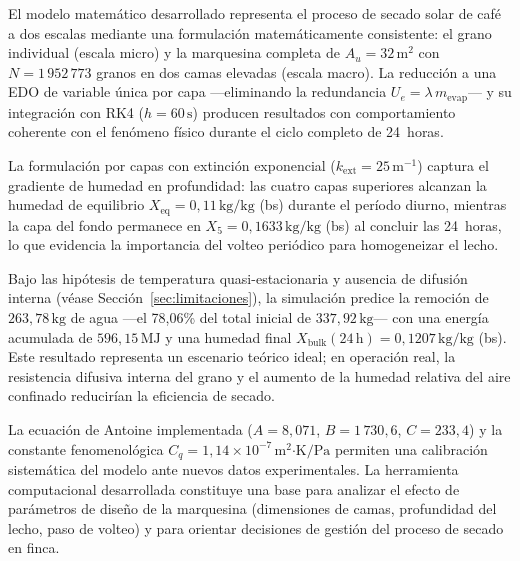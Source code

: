 \documentclass[conference]{IEEEtran}
\begin{document}
El modelo matemático desarrollado representa el proceso de secado solar de café a dos escalas mediante una formulación matemáticamente consistente: el grano individual (escala micro) y la marquesina completa de $A_u = 32\,\text{m}^2$ con $N = 1\,952\,773$ granos en dos camas elevadas (escala macro). La reducción a una EDO de variable única por capa —eliminando la redundancia $U_e = \lambda\,m_{\text{evap}}$— y su integración con RK4 ($h = 60\,\text{s}$) producen resultados con comportamiento coherente con el fenómeno físico durante el ciclo completo de 24~horas.

La formulación por capas con extinción exponencial ($k_{\text{ext}} = 25\,\text{m}^{-1}$) captura el gradiente de humedad en profundidad: las cuatro capas superiores alcanzan la humedad de equilibrio $X_{\text{eq}} = 0{,}11\,\text{kg/kg}$ (bs) durante el período diurno, mientras la capa del fondo permanece en $X_5 = 0{,}1633\,\text{kg/kg}$ (bs) al concluir las 24~horas, lo que evidencia la importancia del volteo periódico para homogeneizar el lecho.

Bajo las hipótesis de temperatura quasi-estacionaria y ausencia de difusión interna (véase Sección~\ref{sec:limitaciones}), la simulación predice la remoción de $263{,}78\,\text{kg}$ de agua —el 78{,}06\% del total inicial de $337{,}92\,\text{kg}$— con una energía acumulada de $596{,}15\,\text{MJ}$ y una humedad final $X_{\text{bulk}}(24\,\text{h}) = 0{,}1207\,\text{kg/kg}$ (bs). Este resultado representa un escenario teórico ideal; en operación real, la resistencia difusiva interna del grano y el aumento de la humedad relativa del aire confinado reducirían la eficiencia de secado.

La ecuación de Antoine implementada ($A = 8{,}071$, $B = 1\,730{,}6$, $C = 233{,}4$) y la constante fenomenológica $C_q = 1{,}14\times10^{-7}\,\text{m}^2\text{·K/Pa}$ permiten una calibración sistemática del modelo ante nuevos datos experimentales. La herramienta computacional desarrollada constituye una base para analizar el efecto de parámetros de diseño de la marquesina (dimensiones de camas, profundidad del lecho, paso de volteo) y para orientar decisiones de gestión del proceso de secado en finca.
\end{document}
